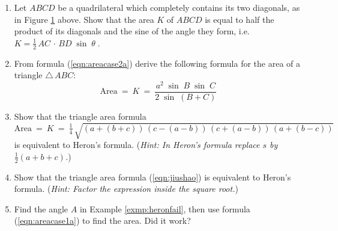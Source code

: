 {\begin{enumerate}[\bfseries 1.]
\begin{figure}[h]
\begin{minipage}[t]{7.5cm}
\begin{center}
\vspace{-5mm}
 \end{center}
 \caption[]{\quad Exercise \ref{exer:areaquaddiag}}
 \label{fig:areaquaddiag}
\end{minipage}
\end{figure}\vspace{-2mm}
 \item\label{exer:areaquaddiag} Let $ABCD$ be a quadrilateral which completely contains its two
  diagonals,
  as in Figure \ref{fig:areaquaddiag} above. Show that the area $K$ of $ABCD$ is equal to half the
  product of its diagonals and the sine of the angle they form, i.e. $K =
  \frac{1}{2}\,AC\,\cdot\,BD\;\sin\;\theta\;$.
 \item From formula (\ref{eqn:areacase2a}) derive the following formula for the area of a triangle
  $\triangle\,ABC$:
  \begin{displaymath}
   \text{Area} ~=~ K ~=~ \frac{a^2 \;\sin\;B \;\sin\;C}{2\;\sin\;(B+C)}
  \end{displaymath}
 \item Show that the triangle area formula
  \begin{displaymath}
   \text{Area} ~=~ K ~=~ \tfrac{1}{4}\,\sqrt{(a + (b+c))\,(c - (a-b))\,(c + (a-b))\,(a + (b-c))}
  \end{displaymath}
  is equivalent to Heron's formula. (\emph{Hint: In Heron's formula replace $s$ by
  $\frac{1}{2}(a+b+c)$.})
 \item\label{exmp:jiushao} Show that the triangle area formula (\ref{eqn:jiushao})
  is equivalent to Heron's formula. (\emph{Hint: Factor the expression inside the square root.})
 \item Find the angle $A$ in Example \ref{exmp:heronfail}, then use formula (\ref{eqn:areacase1a})
  to find the area. Did it work?
\end{enumerate}}
\newpage
